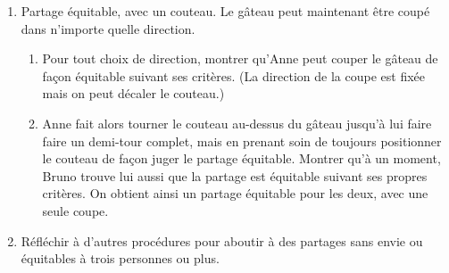 \begin{exo}
\begin{enumerate}
\begin{enumerate}
\end{enumerate}
\item Partage équitable, avec un couteau. Le gâteau peut maintenant être coupé dans n'importe quelle direction. 
\begin{enumerate}
\item Pour tout choix de direction, montrer qu'Anne peut couper le gâteau de façon équitable suivant ses critères. (La direction de la coupe est fixée mais on peut \og décaler\fg{} le couteau.)
\item Anne fait alors tourner le couteau au-dessus du gâteau jusqu'à lui faire faire un demi-tour complet, mais en prenant soin de toujours positionner le couteau de façon juger le partage équitable. Montrer qu'à un moment, Bruno trouve lui aussi que la partage est équitable suivant ses propres critères. On obtient ainsi un partage équitable pour les deux, avec une seule coupe.
\end{enumerate}
\item Réfléchir à d'autres procédures pour aboutir à des partages sans envie ou équitables à trois personnes ou plus.
\end{enumerate}
\end{exo}
